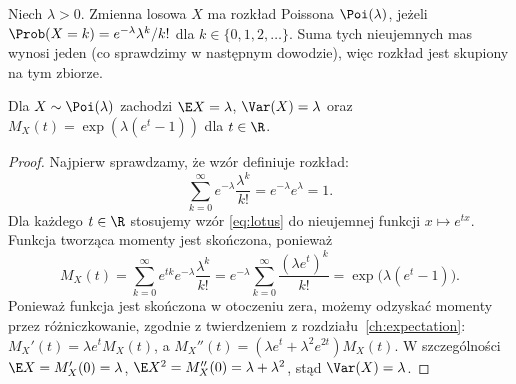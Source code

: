 \begin{definicja}
Niech $\lambda>0$. Zmienna losowa $X$ ma rozkład Poissona
$\Poi(\lambda)$, jeżeli
$\Prob(X=k)=e^{-\lambda}\lambda^k/k!$ dla
$k\in\{0,1,2,\ldots\}$. Suma tych nieujemnych mas
wynosi jeden (co sprawdzimy w następnym dowodzie),
więc rozkład jest skupiony na tym zbiorze.
\end{definicja}

\begin{stwierdzenie}
Dla $X\sim\Poi(\lambda)$ zachodzi
$\E X=\lambda$, $\Var(X)=\lambda$ oraz
$M_X(t)=\exp(\lambda(e^t-1))$ dla $t\in\R$.
\end{stwierdzenie}
\begin{proof}
Najpierw sprawdzamy, że wzór definiuje rozkład:
\[
\sum_{k=0}^\infty e^{-\lambda}\frac{\lambda^k}{k!}
=e^{-\lambda}e^\lambda=1.
\]
Dla każdego $t\in\R$ stosujemy wzór \eqref{eq:lotus}
do nieujemnej funkcji $x\mapsto e^{tx}$.
Funkcja tworząca momenty jest skończona, ponieważ
\[
M_X(t)=\sum_{k=0}^\infty e^{tk}
 e^{-\lambda}\frac{\lambda^k}{k!}
=e^{-\lambda}\sum_{k=0}^\infty\frac{(\lambda e^t)^k}{k!}
=\exp\bigl(\lambda(e^t-1)\bigr).
\]
Ponieważ funkcja jest skończona w otoczeniu zera,
możemy odzyskać momenty przez różniczkowanie, zgodnie
z twierdzeniem z rozdziału~\ref{ch:expectation}:
$M_X'(t)=\lambda e^tM_X(t)$,
a $M_X''(t)=(\lambda e^t+\lambda^2e^{2t})M_X(t)$.
W szczególności $\E X=M_X'(0)=\lambda$,
$\E X^2=M_X''(0)=\lambda+\lambda^2$,
stąd $\Var(X)=\lambda$.
\end{proof}

